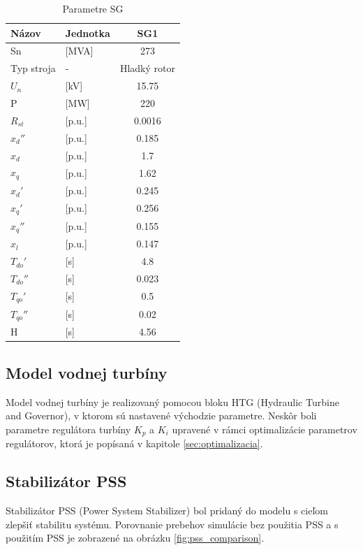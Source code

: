 \begin{table}[htbp]
    \centering
    \begin{tabular}{llc}
        \hline
        Názov & Jednotka & SG1 \\
        \hline
        Sn & [MVA] & 273 \\
        Typ stroja & - & Hladký rotor \\
        $U_n$ & [kV] & 15.75 \\
        P & [MW] & 220 \\
        $R_{st}$ & [p.u.] & 0.0016 \\
        $x_d''$ & [p.u.] & 0.185 \\
        $x_d$ & [p.u.] & 1.7 \\
        $x_q$ & [p.u.] & 1.62 \\
        $x_d'$ & [p.u.] & 0.245 \\
        $x_q'$ & [p.u.] & 0.256 \\
        $x_q''$ & [p.u.] & 0.155 \\
        $x_l$ & [p.u.] & 0.147 \\
        $T_{do}'$ & [s] & 4.8 \\
        $T_{do}''$ & [s] & 0.023 \\
        $T_{qo}'$ & [s] & 0.5 \\
        $T_{qo}''$ & [s] & 0.02 \\
        H & [s] & 4.56 \\
        \hline
    \end{tabular}
    \caption{Parametre SG}
    \label{tab:parametre_sg}
\end{table}
 

\subsection{Model vodnej turbíny}
Model vodnej turbíny je realizovaný pomocou bloku HTG (Hydraulic Turbine and Governor), v ktorom sú nastavené východzie parametre. Neskôr boli parametre regulátora turbíny $K_p$ a $K_i$ upravené v rámci optimalizácie parametrov regulátorov, ktorá je popísaná v kapitole \ref{sec:optimalizacia}.

\subsection{Stabilizátor PSS}
Stabilizátor PSS (Power System Stabilizer) bol pridaný do modelu s cieľom zlepšiť stabilitu systému. Porovnanie prebehov simulácie bez použitia PSS a s použitím PSS je zobrazené na obrázku \ref{fig:pss_comparison}. 



